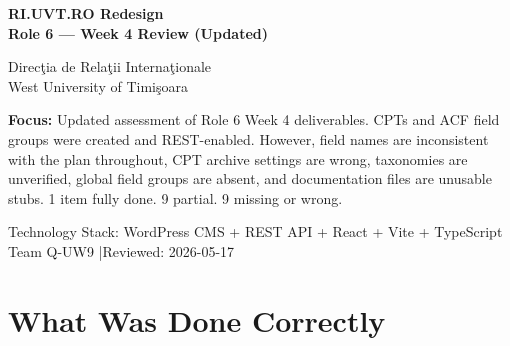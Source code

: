 \documentclass[12pt,a4paper]{article}
\begin{document}

\begin{titlepage}
    \pagecolor{uvtDarkBlue}
    \color{white}

    \vspace*{2cm}

    {\Huge\bfseries RI.UVT.RO Redesign\\[0.25em]
    Role 6 --- Week 4 Review (Updated)\par}

    \vspace{0.8cm}

    {\Large Direc\c{t}ia de Rela\c{t}ii Interna\c{t}ionale\\
    West University of Timi\c{s}oara\par}

    \vspace{1.5cm}

    \begin{yellowbox}
        \color{textGray}
        \textbf{Focus:} Updated assessment of Role 6 Week 4 deliverables.
        CPTs and ACF field groups were created and REST-enabled. However,
        field names are inconsistent with the plan throughout, CPT archive
        settings are wrong, taxonomies are unverified, global field groups
        are absent, and documentation files are unusable stubs.
        1 item fully done. 9 partial. 9 missing or wrong.
    \end{yellowbox}

    \vfill

    {\large Technology Stack: WordPress CMS + REST API + React + Vite + TypeScript\\[0.4em]
    Team Q-UW9 \quad|\quad Reviewed: 2026-05-17}

    \vspace{1cm}
\end{titlepage}

\nopagecolor
\color{textGray}

\tableofcontents
\newpage

\section{What Was Done Correctly}
\end{document}
